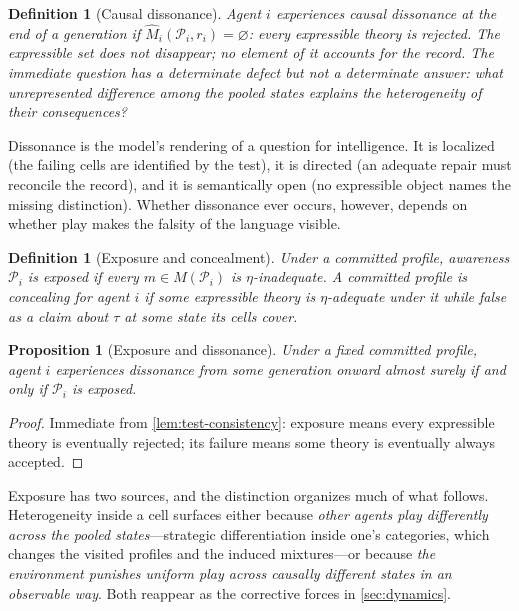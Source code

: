 \documentclass[11pt]{article}
\newtheorem{definition}[assumption]{Definition}
\newtheorem{proposition}[assumption]{Proposition}
\theoremstyle{definition}
\newcommand{\emptysetset}{\varnothing}
\begin{document}
\begin{definition}[Causal dissonance]
\label{def:dissonance}
Agent $i$ experiences \emph{causal dissonance} at the end of a generation if
$\widehat M_i(\mathcal P_i,r_i)=\emptysetset$: every expressible theory is
rejected.  The expressible set does not disappear; no element of it accounts
for the record.  The immediate question has a determinate defect but not a
determinate answer: \emph{what unrepresented difference among the pooled
states explains the heterogeneity of their consequences?}
\end{definition}

Dissonance is the model's rendering of a question for intelligence.  It is
localized (the failing cells are identified by the test), it is directed (an
adequate repair must reconcile the record), and it is semantically open (no
expressible object names the missing distinction).  Whether dissonance ever
occurs, however, depends on whether play makes the falsity of the language
visible.

\begin{definition}[Exposure and concealment]
\label{def:exposure}
Under a committed profile, awareness $\mathcal P_i$ is \emph{exposed} if
every $m\in M(\mathcal P_i)$ is $\eta$-inadequate.  A committed profile is
\emph{concealing} for agent $i$ if some expressible theory is
$\eta$-adequate under it while false as a claim about $\tau$ at some state
its cells cover.
\end{definition}

\begin{proposition}[Exposure and dissonance]
\label{prop:exposure}
Under a fixed committed profile, agent $i$ experiences dissonance from some
generation onward almost surely if and only if $\mathcal P_i$ is exposed.
\end{proposition}

\begin{proof}
Immediate from \cref{lem:test-consistency}: exposure means every expressible
theory is eventually rejected; its failure means some theory is eventually
always accepted.
\end{proof}

Exposure has two sources, and the distinction organizes much of what
follows.  Heterogeneity inside a cell surfaces either because \emph{other
agents play differently across the pooled states}---strategic
differentiation inside one's categories, which changes the visited profiles
and the induced mixtures---or because \emph{the environment punishes uniform
play across causally different states in an observable way}.  Both reappear
as the corrective forces in \cref{sec:dynamics}.
\end{document}
